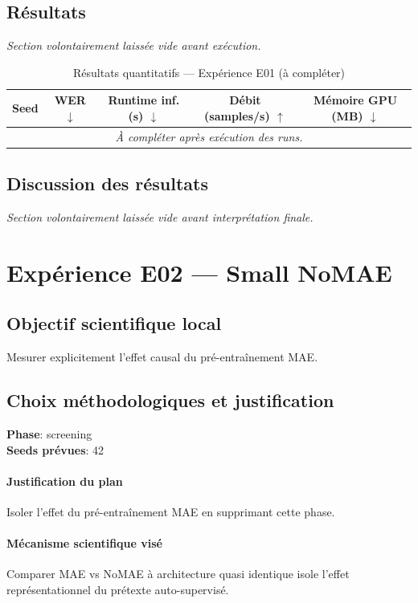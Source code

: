 \documentclass[11pt,a4paper]{article}
\begin{document}
\subsection{Résultats}
\textit{Section volontairement laissée vide avant exécution.}

\begin{table}[H]
\centering
\caption{Résultats quantitatifs --- Expérience E01 (à compléter)}
\begin{tabular}{lcccc}
\toprule
Seed & WER $\downarrow$ & Runtime inf. (s) $\downarrow$ & Débit (samples/s) $\uparrow$ & Mémoire GPU (MB) $\downarrow$ \\
\midrule
\multicolumn{5}{c}{\textit{À compléter après exécution des runs.}} \\
\bottomrule
\end{tabular}
\end{table}

\subsection{Discussion des résultats}
\textit{Section volontairement laissée vide avant interprétation finale.}


\section{Expérience E02 --- Small NoMAE}
\subsection{Objectif scientifique local}
Mesurer explicitement l'effet causal du pré-entraînement MAE.

\subsection{Choix méthodologiques et justification}
\textbf{Phase}: screening\\
\textbf{Seeds prévues}: 42\\


\paragraph{Justification du plan}
Isoler l'effet du pré-entraînement MAE en supprimant cette phase.

\paragraph{Mécanisme scientifique visé}
Comparer MAE vs NoMAE à architecture quasi identique isole l'effet représentationnel du prétexte auto-supervisé.
\end{document}
